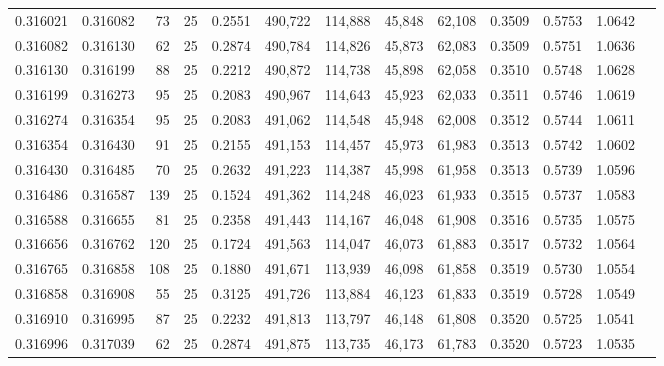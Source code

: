 \begin{tabular}{rrrrrrrrrrrrr}
0.316021 & 0.316082 &    73 &  25 &                                     0.2551 & 490,722 & 114,888 &  45,848 &  62,108 & 0.3509 & 0.5753 & 1.0642 \\
0.316082 & 0.316130 &    62 &  25 &                                     0.2874 & 490,784 & 114,826 &  45,873 &  62,083 & 0.3509 & 0.5751 & 1.0636 \\
0.316130 & 0.316199 &    88 &  25 &                                     0.2212 & 490,872 & 114,738 &  45,898 &  62,058 & 0.3510 & 0.5748 & 1.0628 \\
0.316199 & 0.316273 &    95 &  25 &                                     0.2083 & 490,967 & 114,643 &  45,923 &  62,033 & 0.3511 & 0.5746 & 1.0619 \\
0.316274 & 0.316354 &    95 &  25 &                                     0.2083 & 491,062 & 114,548 &  45,948 &  62,008 & 0.3512 & 0.5744 & 1.0611 \\
0.316354 & 0.316430 &    91 &  25 &                                     0.2155 & 491,153 & 114,457 &  45,973 &  61,983 & 0.3513 & 0.5742 & 1.0602 \\
0.316430 & 0.316485 &    70 &  25 &                                     0.2632 & 491,223 & 114,387 &  45,998 &  61,958 & 0.3513 & 0.5739 & 1.0596 \\
0.316486 & 0.316587 &   139 &  25 &                                     0.1524 & 491,362 & 114,248 &  46,023 &  61,933 & 0.3515 & 0.5737 & 1.0583 \\
0.316588 & 0.316655 &    81 &  25 &                                     0.2358 & 491,443 & 114,167 &  46,048 &  61,908 & 0.3516 & 0.5735 & 1.0575 \\
0.316656 & 0.316762 &   120 &  25 &                                     0.1724 & 491,563 & 114,047 &  46,073 &  61,883 & 0.3517 & 0.5732 & 1.0564 \\
0.316765 & 0.316858 &   108 &  25 &                                     0.1880 & 491,671 & 113,939 &  46,098 &  61,858 & 0.3519 & 0.5730 & 1.0554 \\
0.316858 & 0.316908 &    55 &  25 &                                     0.3125 & 491,726 & 113,884 &  46,123 &  61,833 & 0.3519 & 0.5728 & 1.0549 \\
0.316910 & 0.316995 &    87 &  25 &                                     0.2232 & 491,813 & 113,797 &  46,148 &  61,808 & 0.3520 & 0.5725 & 1.0541 \\
0.316996 & 0.317039 &    62 &  25 &                                     0.2874 & 491,875 & 113,735 &  46,173 &  61,783 & 0.3520 & 0.5723 & 1.0535 \\

\end{tabular}
